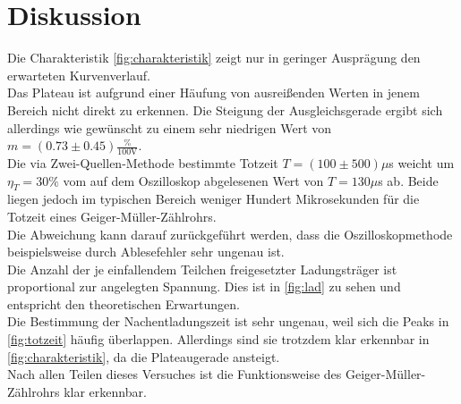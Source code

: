 \section{Diskussion}
\label{sec:Diskussion}

Die Charakteristik \autoref{fig:charakteristik} zeigt nur in geringer Ausprägung den erwarteten 
Kurvenverlauf.\\
Das Plateau ist aufgrund einer Häufung von ausreißenden Werten in jenem Bereich
nicht direkt zu erkennen. Die Steigung der Ausgleichsgerade ergibt sich allerdings wie gewünscht zu einem 
sehr niedrigen Wert von $m = (0.73 \pm 0.45) \mathrm{\frac{\%}{100 V}}$.\\
Die via Zwei-Quellen-Methode bestimmte Totzeit $T = (100 \pm 500) \mu$s weicht um 
$\eta_T = 30 \% $ vom auf dem Oszilloskop abgelesenen Wert von $T = 130 \mu$s 
ab. 
Beide liegen jedoch im typischen Bereich weniger Hundert Mikrosekunden für die Totzeit eines Geiger-Müller-Zählrohrs.\\
Die Abweichung kann darauf zurückgeführt werden, dass die Oszilloskopmethode
beispielsweise durch Ablesefehler sehr ungenau ist.\\
Die Anzahl der je einfallendem Teilchen freigesetzter Ladungsträger 
ist proportional zur angelegten Spannung. Dies ist in \autoref{fig:lad} zu sehen und entspricht den theoretischen Erwartungen.\\
Die Bestimmung der Nachentladungszeit ist sehr ungenau, weil sich die Peaks in \autoref{fig:totzeit} häufig überlappen. Allerdings sind sie trotzdem klar erkennbar in \autoref{fig:charakteristik}, da die Plateaugerade ansteigt.\\
Nach allen Teilen dieses Versuches ist die Funktionsweise des Geiger-Müller-Zählrohrs klar erkennbar.
